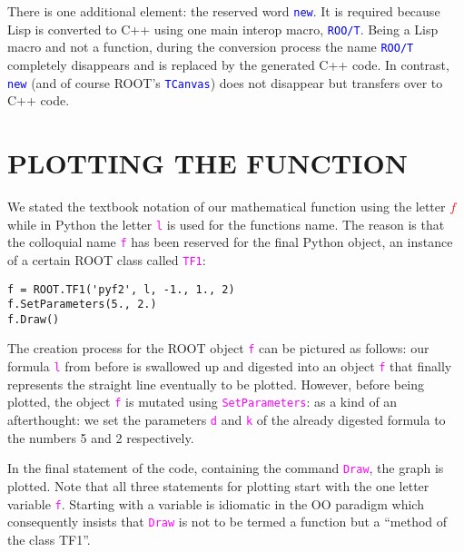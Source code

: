 \documentclass[twocolumn]{article}
\begin{document}
There is one additional element: the reserved word \texttt{\textcolor{blue}{new}}. It is required because Lisp is converted to C++ using one main interop macro, \texttt{\textcolor{blue}{ROO/T}}. Being a Lisp macro and not a function, during the conversion process the name \texttt{\textcolor{blue}{ROO/T}} completely disappears and is replaced by the generated C++ code. In contrast, \texttt{\textcolor{blue}{new}} (and of course ROOT’s \texttt{\textcolor{blue}{TCanvas}}) does not disappear but transfers over to C++ code.

\section{PLOTTING THE FUNCTION}
We stated the textbook notation of our mathematical function using the letter \textcolor{red}{$f$} while in Python the letter \texttt{\textcolor{magenta}{l}} is used for the functions name. The reason is that the colloquial name \texttt{\textcolor{magenta}{f}} has been reserved for the final Python object, an instance of a certain ROOT class called \texttt{\textcolor{magenta}{TF1}}:
{\color{magenta}\begin{verbatim}
f = ROOT.TF1('pyf2', l, -1., 1., 2)
f.SetParameters(5., 2.)
f.Draw()
\end{verbatim}}
The creation process for the ROOT object \texttt{\textcolor{magenta}{f}} can be pictured as follows: our formula \texttt{\textcolor{magenta}{l}} from before is
swallowed up and digested into an object \texttt{\textcolor{magenta}{f}} that finally represents the straight line eventually to be plotted. However, before being plotted, the object \texttt{\textcolor{magenta}{f}} is mutated using \texttt{\textcolor{magenta}{SetParameters}}: as a kind of an afterthought: we set the parameters \texttt{\textcolor{magenta}{d}} and \texttt{\textcolor{magenta}{k}} of the already digested formula to the numbers 5 and 2 respectively.

In the final statement of the code, containing the command \texttt{\textcolor{magenta}{Draw}}, the graph is plotted. Note that all three statements for plotting start with the one letter variable \texttt{\textcolor{magenta}{f}}. Starting with a variable is idiomatic in the OO paradigm which consequently insists that \texttt{\textcolor{magenta}{Draw}} is not to be termed a function but a “method of the class TF1”.
\end{document}
